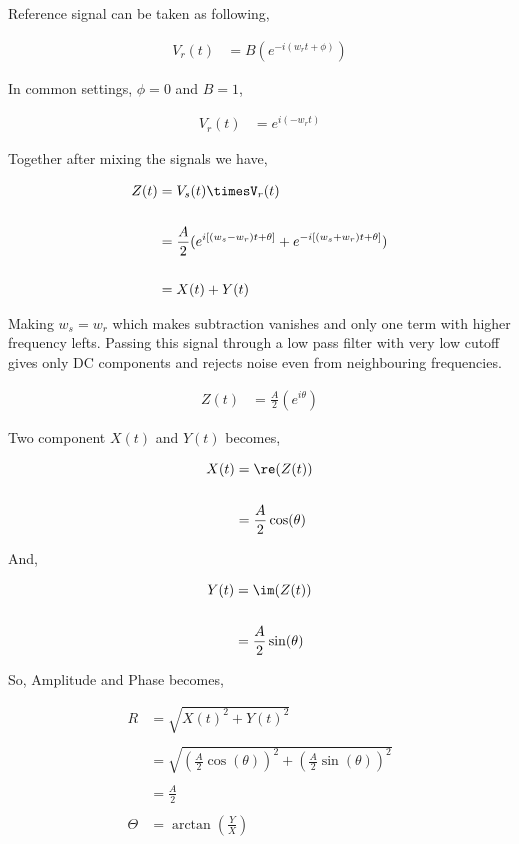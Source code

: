 \documentclass[12pt]{article}
\begin{document}
Reference signal can be taken as following,

\begin{align*}
V_r(t) & = B (e^{-i(w_rt+\phi)})
\end{align*}

In common settings, $\phi = 0$ and $B=1$,

\begin{align*}
V_r(t) & = e^{i(-w_rt)}
\end{align*}

Together after mixing the signals we have,

\begin{align*}
Z(t) & = V_s(t)\timesV_r(t)\\
\\
& = \frac{A}{2}(e^{i\left[ (w_s-w_r)t+\theta \right]}+e^{-i\left[ (w_s+w_r)t+\theta \right]})\\
\\
& = X(t)+Y(t)
\end{align*}

Making $w_s=w_r$ which makes subtraction vanishes and only one term with higher frequency lefts. Passing this signal through a low pass filter with very low cutoff gives only DC components and rejects noise even from neighbouring frequencies.


\begin{align*}
Z(t) & = \frac{A}{2}(e^{i \theta})
\end{align*}

Two component $X(t)$ and $Y(t)$ becomes,

\begin{align*}
X(t) & =\re(Z(t))\\
\\
& =  \frac{A}{2}\cos(\theta)
\end{align*}

And,

\begin{align*}
Y(t) & = \im(Z(t))\\
\\
& =  \frac{A}{2}\sin(\theta)
\end{align*}

So, Amplitude and Phase becomes, 

\begin{align*}
R & = \sqrt{X(t)^2+Y(t)^2}\\
\\
& =  \sqrt{(\frac{A}{2}\cos(\theta))^2+(\frac{A}{2}\sin(\theta))^2}\\
\\
& = \frac{A}{2}\\
\\
\Theta & = \arctan(\frac{Y}{X})
\end{align*}
\end{document}
